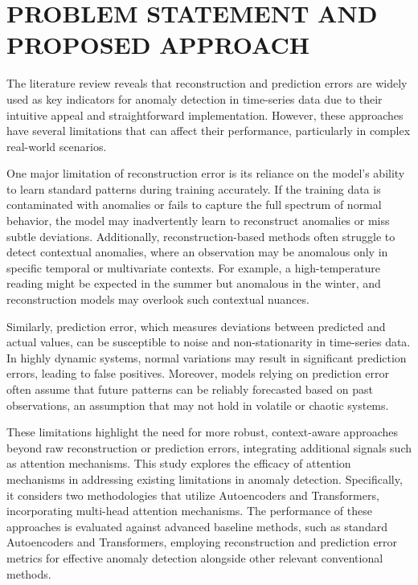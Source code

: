 \documentclass[conference]{IEEEtran}
\begin{document}
\section{PROBLEM STATEMENT AND PROPOSED APPROACH}
\label{sec:approach}

The literature review reveals that reconstruction and prediction errors are widely used as key indicators for anomaly detection in time-series data due to their intuitive appeal and straightforward implementation. However, these approaches have several limitations that can affect their performance, particularly in complex real-world scenarios.

One major limitation of reconstruction error is its reliance on the
model's ability to learn standard patterns during training
accurately. If the training data is contaminated with anomalies or
fails to capture the full spectrum of normal behavior, the model may
inadvertently learn to reconstruct anomalies or miss subtle
deviations. Additionally, reconstruction-based methods often struggle
to detect contextual anomalies, where an observation may be anomalous
only in specific temporal or multivariate contexts. For example, a
high-temperature reading might be expected in the summer but anomalous
in the winter, and reconstruction models may overlook such contextual
nuances.

Similarly, prediction error, which measures deviations between predicted and actual values, can be susceptible to noise and non-stationarity in time-series data. In highly dynamic systems, normal variations may result in significant prediction errors, leading to false positives. Moreover, models relying on prediction error often assume that future patterns can be reliably forecasted based on past observations, an assumption that may not hold in volatile or chaotic systems. 

These limitations highlight the need for more robust, context-aware approaches beyond raw reconstruction or prediction errors, integrating additional signals such as attention mechanisms.
This study explores the efficacy of attention mechanisms in addressing existing limitations in anomaly detection. Specifically, it considers two methodologies that utilize Autoencoders and Transformers, incorporating multi-head attention mechanisms. 
The performance of these approaches is evaluated against advanced baseline methods, such as standard Autoencoders and Transformers, employing reconstruction and prediction error metrics for effective anomaly detection alongside other relevant conventional methods.
\end{document}
